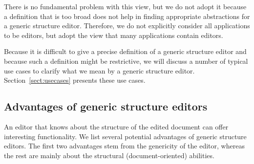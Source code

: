 There is no fundamental problem with this view, but we do not adopt it because a definition that is too broad does not help in finding appropriate abstractions for a generic structure editor. Therefore, we do not explicitly consider all applications to be editors, but adopt the view that many applications contain editors.
\ec


Because it is difficult to give a precise definition of a generic structure editor and because such a definition might be restrictive, we will discuss a number of typical use cases to clarify what we mean by a generic structure editor. Section~\ref{sect:usecases} presents these use cases.





%								
\subsection{Advantages of generic structure editors}

An editor that knows about the structure of the edited document can offer interesting functionality. We list several potential advantages of generic structure editors. The first two advantages stem from the genericity of the editor, whereas the rest are mainly about the structural (document-oriented) abilities.

